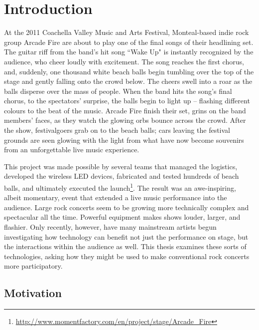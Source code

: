 \chapter{Introduction}

At the 2011 Coachella Valley Music and Arts Festival, Monteal-based indie rock group Arcade Fire are about to play one of the final songs of their headlining set. The guitar riff from the band's hit song ``Wake Up" is instantly recognized by the audience, who cheer loudly with excitement. The song reaches the first chorus, and, suddenly, one thousand white beach balls begin tumbling over the top of the stage and gently falling onto the crowd below. The cheers swell into a roar as the balls disperse over the mass of people. When the band hits the song's final chorus, to the spectators' surprise, the balls begin to light up -- flashing different colours to the beat of the music. Arcade Fire finish their set, grins on the band members' faces, as they watch the glowing orbs bounce across the crowd. After the show, festivalgoers grab on to the beach balls; cars leaving the festival grounds are seen glowing with the light from what have now become souvenirs from an unforgettable live music experience.

This project was made possible by several teams that managed the logistics, developed the wireless LED devices, fabricated and tested hundreds of beach balls, and ultimately executed the launch\footnote{\url{http://www.momentfactory.com/en/project/stage/Arcade_Fire}}. The result was an awe-inspiring, albeit momentary, event that extended a live music performance into the audience. Large rock concerts seem to be growing more technically complex and spectacular all the time. Powerful equipment makes shows louder, larger, and flashier. Only recently, however, have many mainstream artists begun investigating how technology can benefit not just the performance on stage, but the interactions within the audience as well. This thesis examines these sorts of technologies, asking how they might be used to make conventional rock concerts more participatory.




\section{Motivation}

